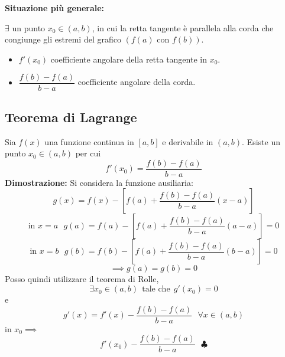 \documentclass[../../main.tex]{subfiles}
\begin{document}
\textbf{Situazione più generale: }
\begin{center}

\end{center}
$\exists$ un punto $x_0\in(a,b)$, in cui la retta tangente è parallela alla corda che congiunge gli estremi del grafico
$(f(a) \text{ con } f(b))$.\\
\begin{itemize}
    \item $f'(x_0)$ coefficiente angolare della retta tangente in $x_0$.
    \item $\dfrac{f(b) - f(a)}{b-a}$ coefficiente angolare della corda.
\end{itemize}

\subsection{Teorema di Lagrange}
Sia $f(x)$ una funzione continua in $[a, b]$ e derivabile in $(a, b)$. Esiste un punto $x_0\in(a, b)$ per cui
\[
    f'(x_0) = \dfrac{f(b) - f(a)}{b-a}
\]
\textbf{Dimostrazione:} Si considera la funzione ausiliaria:
\[
    g(x) = f(x) - [f(a) + \dfrac{f(b) - f(a)}{b-a}(x-a)]
\]
\[
    \text{in }x = a \ \ \ g(a) = f(a) - [f(a) + \dfrac{f(b) - f(a)}{b-a}(a-a)] = 0
\]
\[
    \text{in }x = b \ \ \ g(b) = f(b) - [f(a) + \dfrac{f(b) - f(a)}{b-a}(b-a)] = 0
\]
\[
    \implies g(a) = g(b) = 0
\]
Posso quindi utilizzare il teorema di Rolle,
\[
    \exists x_0\in(a, b) \ \ \text{tale che} \ \ g'(x_0) = 0
\]
e
\[
    g'(x) = f'(x) - \dfrac{f(b) - f(a)}{b-a} \ \ \ \forall x\in(a, b)
\]
in $x_0 \implies$
\[
    f'(x_0) - \dfrac{f(b) - f(a)}{b-a} \ \ \ \clubsuit
\]
\end{document}
